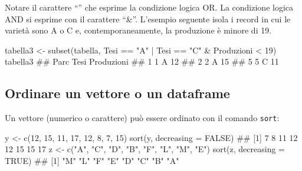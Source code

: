 \documentclass[a4paper,12pt,oneside]{book}
\newenvironment{Shaded}{\begin{snugshade}}{\end{snugshade}}
\newcommand{\DecValTok}[1]{#1}
\newcommand{\ConstantTok}[1]{#1}
\newcommand{\SpecialCharTok}[1]{#1}
\newcommand{\StringTok}[1]{#1}
\newcommand{\DocumentationTok}[1]{#1}
\newcommand{\OtherTok}[1]{#1}
\newcommand{\FunctionTok}[1]{#1}
\newcommand{\AttributeTok}[1]{#1}
\newcommand{\NormalTok}[1]{#1}
\begin{document}
Notare il carattere ``\textbar{}'' che esprime la condizione logica OR. La condizione logica AND si esprime con il carattere ``\&''. L'esempio seguente isola i record in cui le varietà sono A o C e, contemporaneamente, la produzione è minore di 19.

\begin{Shaded}
\begin{Highlighting}[]
\NormalTok{tabella3  }\OtherTok{\textless{}{-}}  \FunctionTok{subset}\NormalTok{(tabella, Tesi }\SpecialCharTok{==} \StringTok{"A"} \SpecialCharTok{|}\NormalTok{ Tesi }\SpecialCharTok{==} \StringTok{"C"} \SpecialCharTok{\&} 
\NormalTok{                       Produzioni }\SpecialCharTok{\textless{}} \DecValTok{19}\NormalTok{)}
\NormalTok{tabella3}
\DocumentationTok{\#\#   Parc Tesi Produzioni}
\DocumentationTok{\#\# 1    1    A         12}
\DocumentationTok{\#\# 2    2    A         15}
\DocumentationTok{\#\# 5    5    C         11}
\end{Highlighting}
\end{Shaded}

\hypertarget{ordinare-un-vettore-o-un-dataframe}{%
\subsection*{Ordinare un vettore o un dataframe}\label{ordinare-un-vettore-o-un-dataframe}}

Un vettore (numerico o carattere) può essere ordinato con il comando \texttt{sort}:

\begin{Shaded}
\begin{Highlighting}[]
\NormalTok{y  }\OtherTok{\textless{}{-}}  \FunctionTok{c}\NormalTok{(}\DecValTok{12}\NormalTok{, }\DecValTok{15}\NormalTok{, }\DecValTok{11}\NormalTok{, }\DecValTok{17}\NormalTok{, }\DecValTok{12}\NormalTok{, }\DecValTok{8}\NormalTok{, }\DecValTok{7}\NormalTok{, }\DecValTok{15}\NormalTok{)}
\FunctionTok{sort}\NormalTok{(y, }\AttributeTok{decreasing =} \ConstantTok{FALSE}\NormalTok{)}
\DocumentationTok{\#\# [1]  7  8 11 12 12 15 15 17}
\NormalTok{z  }\OtherTok{\textless{}{-}}  \FunctionTok{c}\NormalTok{(}\StringTok{"A"}\NormalTok{, }\StringTok{"C"}\NormalTok{, }\StringTok{"D"}\NormalTok{, }\StringTok{"B"}\NormalTok{, }\StringTok{"F"}\NormalTok{, }\StringTok{"L"}\NormalTok{, }\StringTok{"M"}\NormalTok{, }\StringTok{"E"}\NormalTok{)}
\FunctionTok{sort}\NormalTok{(z, }\AttributeTok{decreasing =} \ConstantTok{TRUE}\NormalTok{)}
\DocumentationTok{\#\# [1] "M" "L" "F" "E" "D" "C" "B" "A"}
\end{Highlighting}
\end{Shaded}
\end{document}
